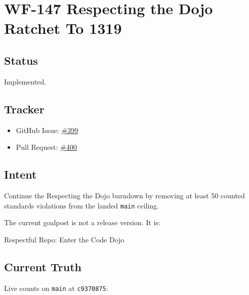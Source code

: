 \chapter{WF-147 Respecting the Dojo Ratchet To 1319}\label{record-229}

\smallskip

\section{Status}\label{record-229-status}

Implemented.

\section{Tracker}\label{record-229-tracker}

\begin{itemize}
\tightlist
\item
  GitHub Issue: \href{https://github.com/flyingrobots/bijou/issues/399}{\#399}
\item
  Pull Request: \href{https://github.com/flyingrobots/bijou/pull/400}{\#400}
\end{itemize}

\section{Intent}\label{record-229-intent}

Continue the Respecting the Dojo burndown by removing at least 50 counted standards violations from the landed \texttt{m\allowbreak{}a\allowbreak{}i\allowbreak{}n} ceiling.

The current goalpost is not a release version. It is:

\begin{CodeBlock}
Respectful Repo: Enter the Code Dojo
\end{CodeBlock}

\section{Current Truth}\label{record-229-current-truth}

Live counts on \texttt{m\allowbreak{}a\allowbreak{}i\allowbreak{}n} at \texttt{c\allowbreak{}9\allowbreak{}3\allowbreak{}7\allowbreak{}0\allowbreak{}8\allowbreak{}7\allowbreak{}5}:

